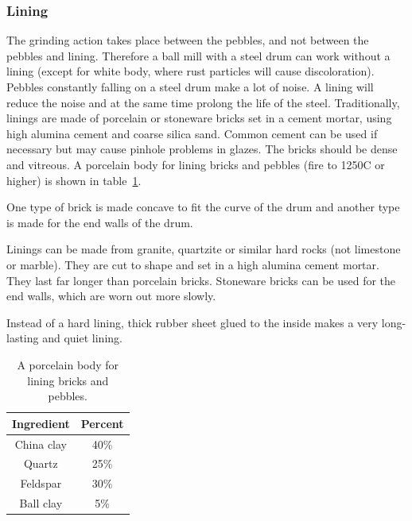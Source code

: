 \subsubsection{Lining}
The grinding action takes place between the pebbles, and not between the 
pebbles and lining. Therefore a ball mill with a steel drum can work without a 
lining (except for white body, where rust particles will cause discoloration). 
Pebbles constantly falling on a steel drum make a lot of noise. A lining will 
reduce the noise and at the same time prolong the life of the steel. 
Traditionally, linings are made of porcelain or stoneware bricks set in a 
cement mortar, using high alumina cement and coarse silica sand. Common cement 
can be used if necessary but may cause pinhole problems in glazes. The bricks 
should be dense and vitreous. A porcelain body for lining bricks and pebbles 
(fire to 1250\degree C or higher) is shown in table~\ref{tab:liningbody}.

One type of brick is made concave to fit the curve of the drum and another type 
is made for the end walls of the drum.

Linings can be made from granite, quartzite or similar hard rocks (not 
limestone or marble). They are cut to shape and set in a high alumina cement 
mortar. They last far longer than porcelain bricks. Stoneware bricks can be 
used for the end walls, which are worn out more slowly.

Instead of a hard lining, thick rubber sheet glued to the inside makes a very 
long-lasting and quiet lining.
\begin{center}
          \renewcommand{\arraystretch}{1.5}
  \begin{table}\centering
    \begin{tabular}{|c|c|}\hline
      \textbf{Ingredient}&\textbf{Percent}\\\hline\hline
      China clay&40\%\\\hline
      Quartz&25\%\\\hline
      Feldspar&30\%\\\hline
      Ball clay&5\%\\\hline
    \end{tabular}
    \caption{A porcelain body for lining bricks and pebbles.}
    \label{tab:liningbody}
  \end{table}
\end{center}
